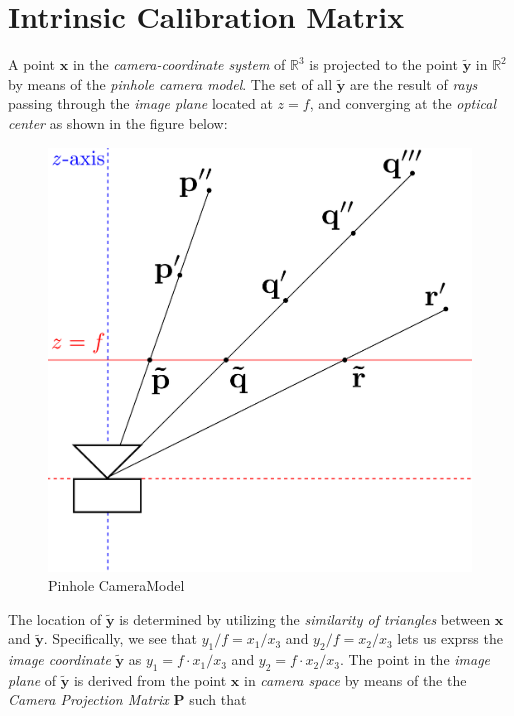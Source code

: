 \section{Intrinsic Calibration Matrix}

\par A point $\mathbf{x}$ in the \textit{camera-coordinate system} of $\mathbb{R}^3$ is projected to the point $\mathbf{\tilde{y}}$ in $\mathbb{R}^{2}$ by means of the \textit{pinhole camera model}. The set of all $\mathbf{\tilde{y}}$ are the result of \textit{rays} passing through the \textit{image plane} located at $z=f$, and converging at the \textit{optical center} as shown in the figure below:
\begin{figure}[htbp]
	\centering
%	
	\includegraphics[scale=0.25]{Camera}
	\caption{Pinhole CameraModel}
\end{figure}\newline
The location of $\mathbf{\tilde{y}}$ is determined by utilizing the \textit{similarity of triangles} between $\mathbf{x}$ and $\mathbf{\tilde{y}}$. Specifically, we see that $y_1/f=x_1/x_3$ and $y_2/f=x_2/x_3$ lets us exprss the \textit{image coordinate} $\mathbf{\tilde{y}}$ as $y_1=f\cdot x_1/x_3$ and $y_2=f\cdot x_2/x_3$. The point in the \textit{image plane} of $\mathbf{\tilde{y}}$ is derived from the point $\mathbf{x}$ in \textit{camera space} by means of the the \textit{Camera Projection Matrix} $\mathbf{P}$ such that

